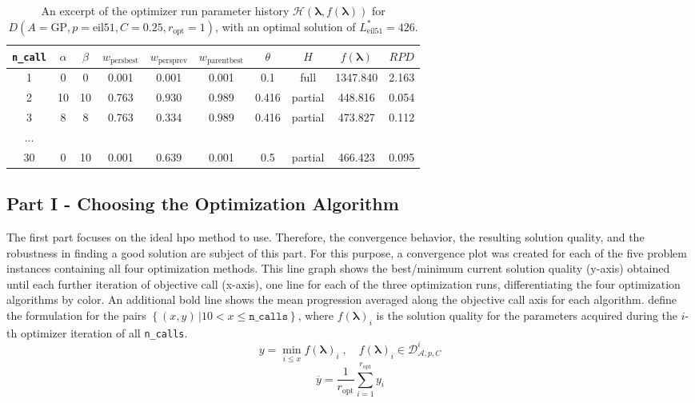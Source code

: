 \begin{table}
	\centering
	\caption[An excerpt of the optimizer run parameter history]{An excerpt of the optimizer run parameter history $\mathcal{H}(\mathbf{\lambda}, f(\mathbf{\lambda}))$ for $D\left( A=\text{GP}, p=\text{eil51}, C=0.25, r_\text{opt} = 1\right) $, with an optimal solution of $L^*_\text{eil51}=426$.}
	\label{tab:part1-2-history}
	\begin{tabular}{c|c|c|c|c|c|c|c|c|c}
		\texttt{n\_call} & $\alpha$ & $\beta$ & $w_{\text{persbest}}$ & $w_{\text{persprev}}$& $w_{\text{parentbest}}$ & $\theta$ & $H$ & $f(\mathbf{\lambda})$ & $RPD$ \\ \hline
		1 & 0 & 0 & 0.001 & 0.001 & 0.001 & 0.1 & full & 1347.840 & 2.163\\
		2 & 10 & 10 & 0.763 & 0.930 & 0.989 & 0.416 & partial & 448.816 & 0.054 \\
		3 & 8 & 8 & 0.763 & 0.334 & 0.989 & 0.416 & partial & 473.827 &  0.112\\
		... & ~ & ~ & ~ & ~ & ~ & ~ & ~ & ~ & ~ \\
		30 & 0 & 10 & 0.001 & 0.639 & 0.001 & 0.5 & partial & 466.423 & 0.095\\
	\end{tabular}
\end{table}

\subsection{Part I - Choosing the Optimization Algorithm}
The first part focuses on the ideal \gls{hpo} method to use. Therefore, the convergence behavior, the resulting solution quality, and the robustness in finding a good solution are subject of this part. For this purpose, a convergence plot was created for each of the five problem instances containing all four optimization methods. This line graph shows the best/minimum current solution quality (y-axis) obtained until each further iteration of objective call (x-axis), one line for each of the three optimization runs, differentiating the four optimization algorithms by color. An additional bold line shows the mean progression averaged along the objective call axis for each algorithm.  define the formulation for the pairs $\left\lbrace (x,y) \, | 10 < x \leq \texttt{n\_calls} \right\rbrace $, where $f(\mathbf{\lambda})_i$ is the solution quality for the parameters acquired during the $i$-th optimizer iteration of all \texttt{n\_calls}.
\begin{equation}
	\label{eq:convergence-plot}
	y = \min_{i \leq x} f(\mathbf{\lambda})_i \; , \quad f(\mathbf{\lambda})_i \in \mathcal{D}^i_{\mathcal{A},p,C}
\end{equation}
\begin{equation}
	\label{eq:convergence-plot-mean}
	\overline{y} = \frac{1}{r_\text{opt}} \sum_{i=1}^{r_\text{opt}} y_i
\end{equation}

